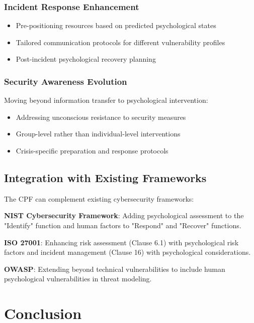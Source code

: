 \documentclass[11pt,a4paper]{article}
\begin{document}
\subsubsection{Incident Response Enhancement}

\begin{itemize}
\item Pre-positioning resources based on predicted psychological states
\item Tailored communication protocols for different vulnerability profiles
\item Post-incident psychological recovery planning
\end{itemize}

\subsubsection{Security Awareness Evolution}

Moving beyond information transfer to psychological intervention:
\begin{itemize}
\item Addressing unconscious resistance to security measures
\item Group-level rather than individual-level interventions
\item Crisis-specific preparation and response protocols
\end{itemize}

\subsection{Integration with Existing Frameworks}

The CPF can complement existing cybersecurity frameworks:

\textbf{NIST Cybersecurity Framework}: Adding psychological assessment to the "Identify" function and human factors to "Respond" and "Recover" functions.

\textbf{ISO 27001}: Enhancing risk assessment (Clause 6.1) with psychological risk factors and incident management (Clause 16) with psychological considerations.

\textbf{OWASP}: Extending beyond technical vulnerabilities to include human psychological vulnerabilities in threat modeling.

\section{Conclusion}
\end{document}
